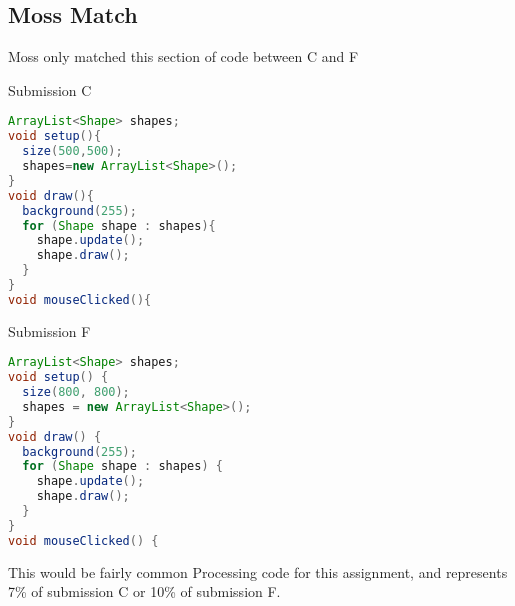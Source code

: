 \documentclass[12pt,final,thesis,actual]{uhthesis}
\begin{document}
\subsection{\textbf{Moss Match}}
Moss only matched this section of code between C and F
\begin{multicols}{2}
\noindent{}Submission C
\begin{lstlisting}[language=java]
ArrayList<Shape> shapes;
void setup(){
  size(500,500);
  shapes=new ArrayList<Shape>();
}
void draw(){
  background(255);
  for (Shape shape : shapes){
    shape.update();
    shape.draw();
  }
}
void mouseClicked(){

\end{lstlisting}
Submission F
\begin{lstlisting}[language=java]
ArrayList<Shape> shapes;
void setup() {
  size(800, 800);
  shapes = new ArrayList<Shape>();
}
void draw() {
  background(255);
  for (Shape shape : shapes) {
    shape.update();
    shape.draw();
  }
}
void mouseClicked() {
\end{lstlisting}
\end{multicols}
This would be fairly common Processing code for this assignment, and represents 7\% of submission C or 10\% of submission F.
\end{document}
